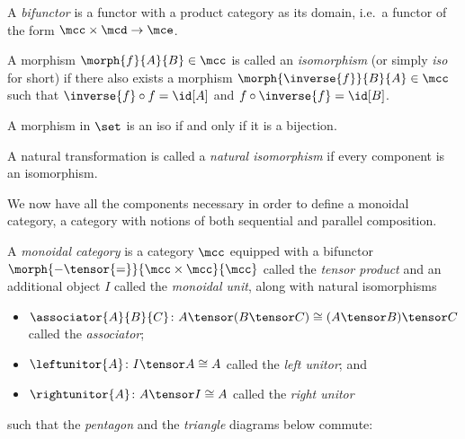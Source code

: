 \begin{definition}[Bifunctor]
    A \emph{bifunctor} is a functor with a product category as its domain, i.e.\
    a functor of the form \(\mcc \times \mcd \to \mce\).
\end{definition}

\begin{definition}[Isomorphism]
    A morphism \(\morph{f}{A}{B} \in \mcc\) is called an \emph{isomorphism} (or
    simply \emph{iso} for short) if there also exists a morphism \(
        \morph{\inverse{f}}{B}{A} \in \mcc
    \) such that \(
        \inverse{f} \circ f = \id[A]
    \) and \(
        f \circ \inverse{f} = \id[B]
    \).
\end{definition}

\begin{example}
    A morphism in \(\set\) is an iso if and only if it is a bijection.
\end{example}

\begin{definition}
    A natural transformation is called a \emph{natural isomorphism} if every
    component is an isomorphism.
\end{definition}

We now have all the components necessary in order to define a monoidal category,
a category with notions of both sequential and parallel composition.

\begin{definition}
    \label{def:monoidal-category}
    A \emph{monoidal category} is a category \(\mcc\) equipped with a
    bifunctor \(\morph{{-} \tensor {=}}{\mcc \times \mcc}{\mcc}\) called the
    \emph{tensor product} and an additional object \(I\) called the
    \emph{monoidal unit},
    along with natural isomorphisms
    \begin{itemize}
        \item \(
            \associator{A}{B}{C}
            \colon
            A \tensor (B \tensor C)
            \cong
            (A \tensor B) \tensor C
            \) called the \emph{associator};
        \item \(
            \leftunitor{A}
            \colon
            I \tensor A
            \cong
            A
            \) called the \emph{left unitor}; and
        \item \(
            \rightunitor{A}
            \colon
            A \tensor I
            \cong
            A
            \) called the \emph{right unitor}
    \end{itemize}
    such that the \emph{pentagon} and the \emph{triangle} diagrams below
    commute:
    \begin{center}
        

        \vspace{1em}

        
    \end{center}
\end{definition}

